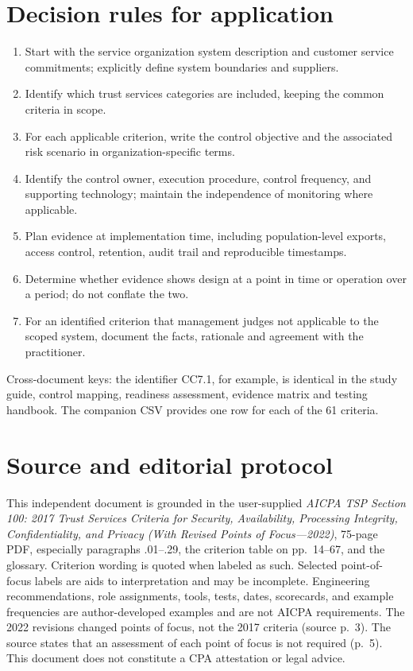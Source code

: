 \documentclass[10pt,oneside]{report}
\begin{document}
\chapter{Decision rules for application}
\begin{enumerate}
\item Start with the service organization system description and customer service commitments; explicitly define system boundaries and suppliers.
\item Identify which trust services categories are included, keeping the common criteria in scope.
\item For each applicable criterion, write the control objective and the associated risk scenario in organization-specific terms.
\item Identify the control owner, execution procedure, control frequency, and supporting technology; maintain the independence of monitoring where applicable.
\item Plan evidence at implementation time, including population-level exports, access control, retention, audit trail and reproducible timestamps.
\item Determine whether evidence shows design at a point in time or operation over a period; do not conflate the two.
\item For an identified criterion that management judges not applicable to the scoped system, document the facts, rationale and agreement with the practitioner.
\end{enumerate}

Cross-document keys: the identifier CC7.1, for example, is identical in the study guide, control mapping, readiness assessment, evidence matrix and testing handbook. The companion CSV provides one row for each of the 61 criteria.


\chapter*{Source and editorial protocol}
This independent document is grounded in the user-supplied \emph{AICPA TSP Section 100: 2017 Trust Services Criteria for Security, Availability, Processing Integrity, Confidentiality, and Privacy (With Revised Points of Focus---2022)}, 75-page PDF, especially paragraphs .01--.29, the criterion table on pp.~14--67, and the glossary. Criterion wording is quoted when labeled as such. Selected point-of-focus labels are aids to interpretation and may be incomplete. Engineering recommendations, role assignments, tools, tests, dates, scorecards, and example frequencies are author-developed examples and are not AICPA requirements. The 2022 revisions changed points of focus, not the 2017 criteria (source p.~3). The source states that an assessment of each point of focus is not required (p.~5). This document does not constitute a CPA attestation or legal advice.
\end{document}
